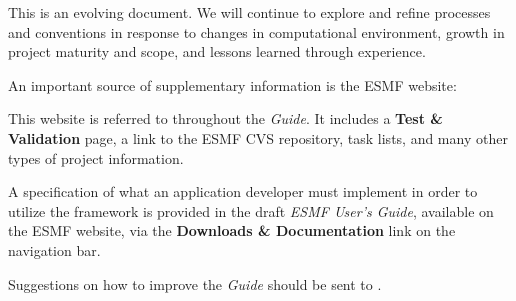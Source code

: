 This is an evolving document.  We will continue to explore and refine
processes and conventions in response to changes in computational 
environment, growth in project maturity and scope, and lessons learned
through experience.

An important source of supplementary information is the ESMF website:
\begin{center}
\end{center}
This website is referred to throughout the {\it Guide}.  
It includes a 
{\bf Test \& Validation} page, a link to the ESMF CVS repository, task
lists, and many other types of project information.

A specification of what an application developer must implement in
order to utilize the framework is provided in the draft {\it ESMF
User's Guide}\cite{bib:ESMFusrdoc}, available on the ESMF website, 
via the {\bf Downloads \& Documentation} link on the navigation bar.

Suggestions on how to improve the {\it Guide} should be sent to 
.





















